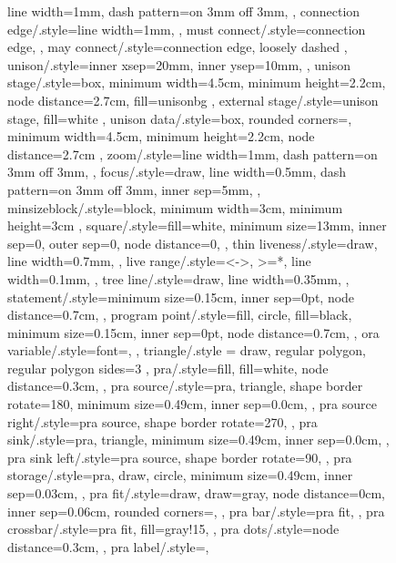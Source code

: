 \documentclass[acmsmall,authorversion,nonacm]{acmart}
\begin{document}
\begin{figure}
{{{{    line width=1mm,
    dash pattern=on 3mm off 3mm,
  },
  connection edge/.style={line width=1mm,
  },
  must connect/.style={connection edge,
  },
  may connect/.style={connection edge,
    loosely dashed
  },
  unison/.style={inner xsep=20mm,
    inner ysep=10mm,
  },
  unison stage/.style={box,
    minimum width=4.5cm,
    minimum height=2.2cm,
    node distance=2.7cm,
    fill=unisonbg
  },
  external stage/.style={unison stage,
    fill=white
  },
  unison data/.style={box,
    rounded corners=\cornerRadius,
    minimum width=4.5cm,
    minimum height=2.2cm,
    node distance=2.7cm
  },
  zoom/.style={line width=1mm,
    dash pattern=on 3mm off 3mm,
  },
  focus/.style={draw,
    line width=0.5mm,
    dash pattern=on 3mm off 3mm,
    inner sep=5mm,
  },
  minsizeblock/.style={block,
    minimum width=3cm,
    minimum height=3cm
  },
  square/.style={fill=white,
    minimum size=13mm,
    inner sep=0,
    outer sep=0,
    node distance=0,
  },
  thin liveness/.style={draw,
    line width=0.7mm,
  },
  live range/.style={<->,
      >=*,
      line width=0.1mm,
    },
  tree line/.style={draw,
    line width=0.35mm,
  },
  statement/.style={minimum size=0.15cm,
    inner sep=0pt,
    node distance=0.7cm,
  },
  program point/.style={fill,
    circle,
    fill=black,
    minimum size=0.15cm,
    inner sep=0pt,
    node distance=0.7cm,
  },
  ora variable/.style={font=\small,
  },
  triangle/.style = {draw, regular polygon, regular polygon sides=3 },
  pra/.style={fill,
    fill=white,
    node distance=0.3cm,
  },
  pra source/.style={pra,
    triangle,
    shape border rotate=180,
    minimum size=0.49cm,
    inner sep=0.0cm,
  },
  pra source right/.style={pra source,
    shape border rotate=270,
  },
  pra sink/.style={pra,
    triangle,
    minimum size=0.49cm,
    inner sep=0.0cm,
  },
  pra sink left/.style={pra source,
    shape border rotate=90,
  },
  pra storage/.style={pra,
    draw,
    circle,
    minimum size=0.49cm,
    inner sep=0.03cm,
  },
  pra fit/.style={draw,
    draw=gray,
    node distance=0cm,
    inner sep=0.06cm,
    rounded corners=\cornerRadius,
  },
  pra bar/.style={pra fit,
  },
  pra crossbar/.style={pra fit,
    fill=gray!15,
  },
  pra dots/.style={node distance=0.3cm,
  },
  pra label/.style={},
} 

}}
\end{figure}
\end{document}
